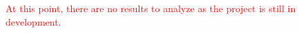 \textcolor{red}{At this point, there are no results to analyze as the project
is still in development.}
